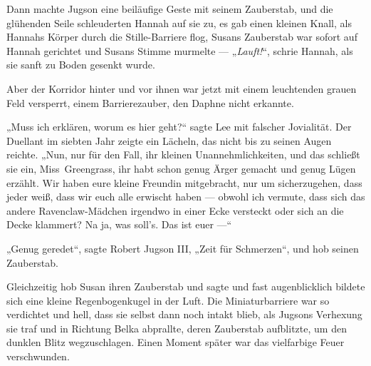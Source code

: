 Dann machte Jugson eine beiläufige Geste mit seinem Zauberstab, und die glühenden Seile schleuderten Hannah auf sie zu, es gab einen kleinen Knall, als Hannahs Körper durch die Stille-Barriere flog, Susans Zauberstab war sofort auf Hannah gerichtet und Susans Stimme murmelte  —
„\emph{Lauft!}“, schrie Hannah, als sie sanft zu Boden gesenkt wurde.

Aber der Korridor hinter und vor ihnen war jetzt mit einem leuchtenden grauen Feld versperrt, einem Barrierezauber, den Daphne nicht erkannte.

„Muss ich erklären, worum es hier geht?“ sagte Lee mit falscher Jovialität. Der Duellant im siebten Jahr zeigte ein Lächeln, das nicht bis zu seinen Augen reichte.
„Nun, nur für den Fall, ihr kleinen Unannehmlichkeiten, und das schließt sie ein, Miss~Greengrass, ihr habt schon genug Ärger gemacht und genug Lügen erzählt. Wir haben eure kleine Freundin mitgebracht, nur um sicherzugehen, dass jeder weiß, dass wir euch alle erwischt haben — obwohl ich vermute, dass sich das andere Ravenclaw-Mädchen irgendwo in einer Ecke versteckt oder sich an die Decke klammert? Na ja, was soll’s. Das ist euer —“

„Genug geredet“, sagte Robert Jugson III,
„Zeit für Schmerzen“, und hob seinen Zauberstab. 

Gleichzeitig hob Susan ihren Zauberstab und sagte  und fast augenblicklich bildete sich eine kleine Regenbogenkugel in der Luft. Die Miniaturbarriere war so verdichtet und hell, dass sie selbst dann noch intakt blieb, als Jugsons Verhexung sie traf und in Richtung Belka abprallte, deren Zauberstab aufblitzte, um den dunklen Blitz wegzuschlagen. Einen Moment später war das vielfarbige Feuer verschwunden.

